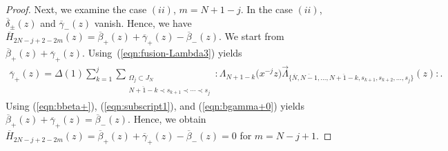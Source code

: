 \documentclass[pdftex]{sigma}
\numberwithin{equation}{section}
\begin{document}
\begin{proof}
Next, we examine the case $(ii)$, $m=N+1-j$.
In the case $(ii)$, $\overline{\delta}_\pm(z)$ and
$\overline{\gamma}_-(z)$ vanish. Hence, we have
$\overline{H}_{2N-j+2-2m}(z)=\overline{\beta}_+(z)+\overline{\gamma}_+(z)
-\overline{\beta}_-(z)$.
We start from $\overline{\beta}_+(z)+\overline{\gamma}_+(z)$.
Using~(\ref{eqn:fusion-Lambda3}) yields
\begin{gather}
\overline{\gamma}_+(z)=\Delta(1)\sum_{k=1}^{j}
\sum\limits_{\substack{\Omega_j \subset J_N
\\ \overline{N+1-k}\prec s_{k+1}\prec \cdots \prec s_j}}\!\!\!\!\!\!\!\!\!\!
{:}\Lambda_{N+1-k}\big(x^{-j}z\big)\overrightarrow{\Lambda}_{\{\overline{N},\overline{N-1},
\dots,\overline{N+1-k}, s_{k+1}, s_{k+2}, \dots, s_j\}}(z){:}.
\label{eqn:bgamma+0}
\end{gather}
Using (\ref{eqn:bbeta+}), (\ref{eqn:subscript1}), and (\ref{eqn:bgamma+0})
yields $\overline{\beta}_+(z)+\overline{\gamma}_+(z)=\overline{\beta}_-(z)$.
Hence, we obtain
$\overline{H}_{2N-j+2-2m}(z)\allowbreak=\overline{\beta}_+(z)
+\overline{\gamma}_+(z)-\overline{\beta}_-(z)=0$
for $m=N-j+1$.


\end{proof}
\end{document}

